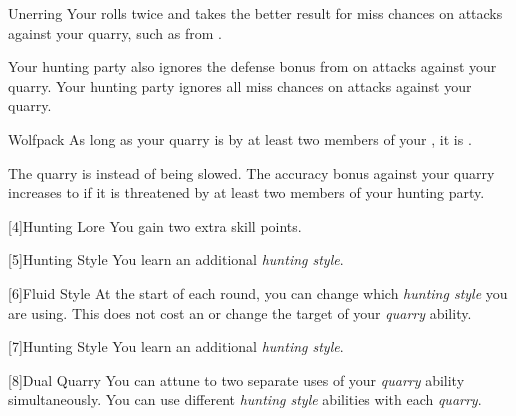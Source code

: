 {            \begin{freeability}{Unerring}
                Your  rolls twice and takes the better result for miss chances on attacks against your quarry, such as from .

                \rankline
                 Your hunting party also ignores the defense bonus from  on attacks against your quarry.
                 Your hunting party ignores all miss chances on attacks against your quarry.
            \end{freeability}

            \begin{freeability}{Wolfpack}
                As long as your quarry is  by at least two members of your , it is .

                \rankline
                 The quarry is  instead of being slowed.
                 The accuracy bonus against your quarry increases to  if it is threatened by at least two members of your hunting party.
            \end{freeability}
        }

        [4]{Hunting Lore} You gain two extra skill points.

        [5]{Hunting Style}
        You learn an additional \textit{hunting style}.

        [6]{Fluid Style}
        At the start of each round, you can change which \textit{hunting style} you are using.
        This does not cost an  or change the target of your \textit{quarry} ability.

        [7]{Hunting Style}
        You learn an additional \textit{hunting style}.

        [8]{Dual Quarry} You can attune to two separate uses of your \textit{quarry} ability simultaneously.
        You can use different \textit{hunting style} abilities with each \textit{quarry}.

\newpage
